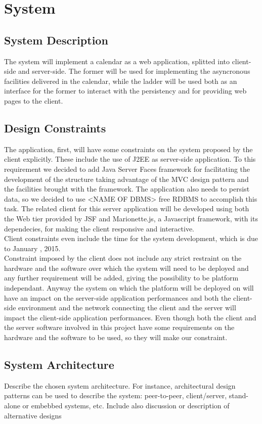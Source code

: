 \chapter{System} \label{cap:cap2}

\section{System Description}
The system will implement a calendar as a web application, splitted into client-side and server-side. The former will be used for implementing the asyncronous facilities delivered in the calendar, while the ladder will be used both as an interface for the former to interact with the persistency and for providing web pages to the client.

\section{Design Constraints}
The application, first, will have some constraints on the system proposed by the client explicitly. These include the use of J2EE as server-side application. To this requirement we decided to add Java Server Faces framework for facilitating the development of the structure taking advantage of the MVC design pattern and the facilities brought with the framework. The application also needs to persist data, so we decided to use <NAME OF DBMS> free RDBMS to accomplish this task. The related client for this server application will be developed using both the Web tier provided by JSF and Marionette.js, a Javascript framework, with its dependecies, for making the client responsive and interactive.\\
Client constraints even include the time for the system development, which is due to January , 2015.\\
Constraint imposed by the client does not include any strict restraint on the hardware and the software over which the system will need to be deployed and any further requirement will be added, giving the possibility to be platform independant. Anyway the system on which the platform will be deployed on will have an impact on the server-side application performances and both the client-side environment and the network connecting the client and the server will impact the client-side application performances. Even though both the client and the server software involved in this project have some requirements on the hardware and the software to be used, so they will make our constraint.

\section{System Architecture}
Describe the chosen system architecture. For instance, architectural design patterns can be used to describe the system: peer-to-peer, client/server, stand-alone or embebbed systems, etc. 
Include also discussion or description of alternative designs